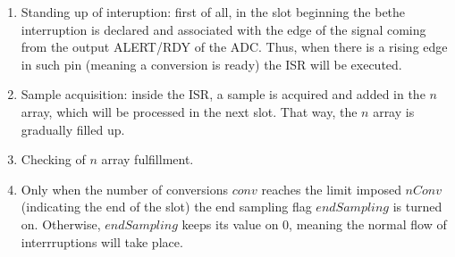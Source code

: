 \documentclass[twoside, twocolumn, spanish] {article}
\begin{document}
\begin{enumerate}
\item Standing up of interuption: first of all, in the slot beginning the bethe interruption is declared and associated with the edge of the signal coming from the output ALERT/RDY of the ADC. Thus, when there is a rising edge in such pin (meaning a conversion is ready) the ISR will be executed.
\item Sample acquisition: inside the ISR, a sample is acquired and added in the $n$ array, which will be processed in the next slot. That way, the $n$ array is gradually filled up.
\item Checking of $n$ array fulfillment.
\item Only when the number of conversions $conv$ reaches the limit imposed $nConv$ (indicating the end of the slot) the end sampling flag $endSampling$ is turned on. Otherwise, $endSampling$ keeps its value on 0, meaning the normal flow of interrruptions will take place.
\end{enumerate}
\end{document}
